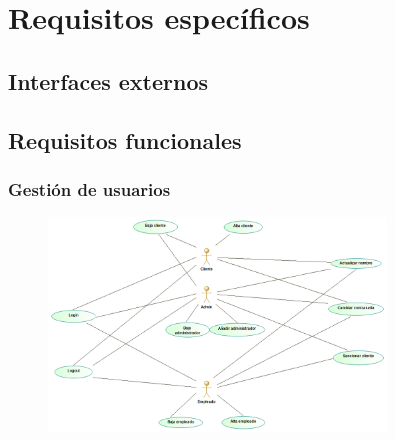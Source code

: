 \section{Requisitos específicos}
\label{sec:req_esp}
\subsection{Interfaces externos}
\subsection{Requisitos funcionales}
\subsubsection{Gestión de usuarios}%
\begin{figure}[H]
    \centering
    \includegraphics[width = 0.8\textwidth]{Use_Cases/Gestion_Usuarios.png}
\end{figure}
